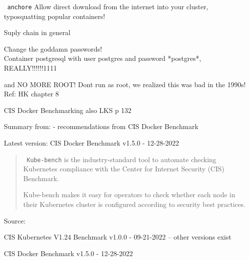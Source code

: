 \documentclass[Screen16to9,17pt]{foils}
\begin{document}

\begin{list2}
\item \faWrench\ \verb+anchore+
Allow direct download from the internet into your cluster, typosquatting popular containers!

\item Suply chain in general
\end{list2}


\begin{list2}
\item Change the goddamn passwords!\\
Container postgresql with user postgres and password *postgres*, REALLY!!!!!!1111

\item and NO MORE ROOT! Dont run as root, we realized this was bad in the 1990s!
Ref: HK chapter 8

\item CIS Docker Benchmarking also LKS p 132
\end{list2}

\slide{}

Summary from:  - recommendations from CIS Docker Benchmark

\begin{list2}
\item Latest version: CIS Docker Benchmark v1.5.0 - 12-28-2022
\end{list2}






\begin{quote}
\faWrench\ \verb+Kube-bench+ is the industry-standard tool to automate checking Kubernetes compliance with the Center for Internet Security (CIS) Benchmark.

Kube-bench makes it easy for operators to check whether each node in their Kubernetes cluster is configured according to security best practices.
\end{quote}
Source: 

\begin{list2}
\item CIS Kubernetes V1.24 Benchmark v1.0.0 - 09-21-2022 -- other versions exist
\item CIS Docker Benchmark v1.5.0 - 12-28-2022
\end{list2}
\end{document}
